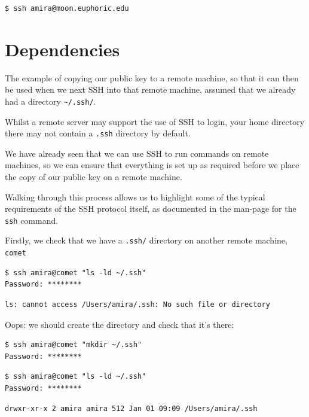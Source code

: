 \documentclass[
]{krantz}
\begin{document}
\begin{verbatim}
$ ssh amira@moon.euphoric.edu
\end{verbatim}

\hypertarget{ssh-filedir}{%
\section{Dependencies}\label{ssh-filedir}}

The example of copying our public key to a remote machine, so that it
can then be used when we next SSH into that remote machine, assumed
that we already had a directory \texttt{\textasciitilde{}/.ssh/}.

Whilst a remote server may support the use of SSH to login, your home
directory there may not contain a \texttt{.ssh} directory by default.

We have already seen that we can use SSH to run commands on remote
machines, so we can ensure that everything is set up as required before
we place the copy of our public key on a remote machine.

Walking through this process allows us to highlight some of the typical
requirements of the SSH protocol itself, as documented in the man-page
for the \texttt{ssh} command.

Firstly, we check that we have a \texttt{.ssh/} directory on another remote
machine, \texttt{comet}

\begin{verbatim}
$ ssh amira@comet "ls -ld ~/.ssh"
Password: ********
\end{verbatim}

\begin{verbatim}
ls: cannot access /Users/amira/.ssh: No such file or directory
\end{verbatim}

Oops:
we should create the directory and check that it's there:

\begin{verbatim}
$ ssh amira@comet "mkdir ~/.ssh"
Password: ********
\end{verbatim}

\begin{verbatim}
$ ssh amira@comet "ls -ld ~/.ssh"
Password: ********
\end{verbatim}

\begin{verbatim}
drwxr-xr-x 2 amira amira 512 Jan 01 09:09 /Users/amira/.ssh
\end{verbatim}
\end{document}
